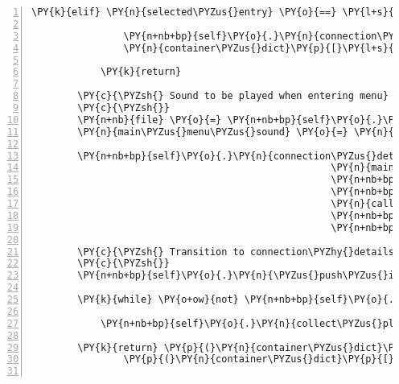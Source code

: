 \begin{Verbatim}[commandchars=\\\{\},numbers=left,firstnumber=1,stepnumber=1]
            \PY{k}{elif} \PY{n}{selected\PYZus{}entry} \PY{o}{==} \PY{l+s}{\PYZsq{}}\PY{l+s}{Beenden}\PY{l+s}{\PYZsq{}}\PY{p}{:}

                \PY{n+nb+bp}{self}\PY{o}{.}\PY{n}{connection\PYZus{}details\PYZus{}complete} \PY{o}{=} \PY{n+nb+bp}{True}
                \PY{n}{container\PYZus{}dict}\PY{p}{[}\PY{l+s}{\PYZsq{}}\PY{l+s}{login\PYZus{}name}\PY{l+s}{\PYZsq{}}\PY{p}{]} \PY{o}{=} \PY{l+s}{\PYZsq{}}\PY{l+s}{exit requested}\PY{l+s}{\PYZsq{}}

            \PY{k}{return}

        \PY{c}{\PYZsh{} Sound to be played when entering menu}
        \PY{c}{\PYZsh{}}
        \PY{n+nb}{file} \PY{o}{=} \PY{n+nb+bp}{self}\PY{o}{.}\PY{n}{assets}\PY{o}{.}\PY{n}{fetch}\PY{p}{(}\PY{l+s}{\PYZsq{}}\PY{l+s}{fabula\PYZus{}main\PYZus{}menu.ogg}\PY{l+s}{\PYZsq{}}\PY{p}{)}
        \PY{n}{main\PYZus{}menu\PYZus{}sound} \PY{o}{=} \PY{n}{pygame}\PY{o}{.}\PY{n}{mixer}\PY{o}{.}\PY{n}{Sound}\PY{p}{(}\PY{n+nb}{file}\PY{p}{)}

        \PY{n+nb+bp}{self}\PY{o}{.}\PY{n}{connection\PYZus{}details\PYZus{}menu} \PY{o}{=} \PY{n}{TextMenuList}\PY{p}{(}\PY{n}{connection\PYZus{}details\PYZus{}entries}\PY{p}{,}
                                                    \PY{n}{main\PYZus{}menu\PYZus{}sound}\PY{p}{,}
                                                    \PY{n+nb+bp}{None}\PY{p}{,}
                                                    \PY{n+nb+bp}{self}\PY{o}{.}\PY{n}{channel\PYZus{}system}\PY{p}{,}
                                                    \PY{n}{callback\PYZus{}on\PYZus{}entry\PYZus{}selected}\PY{p}{,}
                                                    \PY{n+nb+bp}{None}\PY{p}{,}
                                                    \PY{n+nb+bp}{self}\PY{o}{.}\PY{n}{tts\PYZus{}engine}\PY{p}{)}

        \PY{c}{\PYZsh{} Transition to connection\PYZhy{}details\PYZhy{}input\PYZhy{}state}
        \PY{c}{\PYZsh{}}
        \PY{n+nb+bp}{self}\PY{o}{.}\PY{n}{\PYZus{}push\PYZus{}input\PYZus{}state\PYZus{}on\PYZus{}stack}\PY{p}{(}\PY{n+nb+bp}{self}\PY{o}{.}\PY{n}{INPUT\PYZus{}STATE\PYZus{}CONNECTION\PYZus{}DETAILS}\PY{p}{)}

        \PY{k}{while} \PY{o+ow}{not} \PY{n+nb+bp}{self}\PY{o}{.}\PY{n}{connection\PYZus{}details\PYZus{}complete}\PY{p}{:}

            \PY{n+nb+bp}{self}\PY{o}{.}\PY{n}{collect\PYZus{}player\PYZus{}input}\PY{p}{(}\PY{p}{)}

        \PY{k}{return} \PY{p}{(}\PY{n}{container\PYZus{}dict}\PY{p}{[}\PY{l+s}{\PYZsq{}}\PY{l+s}{login\PYZus{}name}\PY{l+s}{\PYZsq{}}\PY{p}{]}\PY{p}{,}
                \PY{p}{(}\PY{n}{container\PYZus{}dict}\PY{p}{[}\PY{l+s}{\PYZsq{}}\PY{l+s}{connector}\PY{l+s}{\PYZsq{}}\PY{p}{]}\PY{p}{,} \PY{l+m+mi}{4011}\PY{p}{)}\PY{p}{)}


\end{Verbatim}
